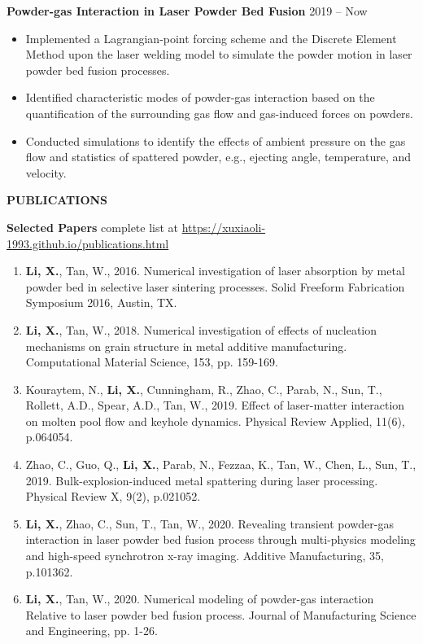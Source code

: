 \documentclass[11pt, letterpaper]{article}
\begin{document}
\vspace{3pt}

\textbf{Powder-gas Interaction in Laser Powder Bed Fusion} \hfill 2019 -- Now
\begin{itemize}[leftmargin=*, labelsep=5mm]
   \item Implemented a Lagrangian-point forcing scheme and the Discrete Element Method upon the
      laser welding model to simulate the powder motion in laser powder bed fusion processes.
   \item Identified characteristic modes of powder-gas interaction based on the quantification of
      the surrounding gas flow and gas-induced forces on powders.
   \item Conducted simulations to identify the effects of ambient pressure on the gas flow and
      statistics of spattered powder, e.g., ejecting angle, temperature, and velocity.
\end{itemize}

\vspace{9pt}

\textbf{PUBLICATIONS}

\fullrule

\textbf{Selected Papers} \hfill complete list at 
\href{https://xuxiaoli-1993.github.io/publications.html}
{https://xuxiaoli-1993.github.io/publications.html}

\begin{enumerate}[leftmargin=*, labelsep=4mm]
   \item \textbf{Li, X.}, Tan, W., 2016. Numerical investigation of laser absorption by metal powder
      bed in selective laser sintering processes. Solid Freeform Fabrication Symposium 2016, Austin,
      TX.

   \item \textbf{Li, X.}, Tan, W., 2018. Numerical investigation of effects of nucleation mechanisms
      on grain structure in metal additive manufacturing. Computational Material Science, 153, pp.
      159-169.

   \item Kouraytem, N., \textbf{Li, X.}, Cunningham, R., Zhao, C., Parab, N., Sun, T., Rollett,
      A.D., Spear, A.D., Tan, W., 2019. Effect of laser-matter interaction on molten pool flow and
      keyhole dynamics. Physical Review Applied, 11(6), p.064054.

   \item Zhao, C., Guo, Q., \textbf{Li, X.}, Parab, N., Fezzaa, K., Tan, W., Chen, L., Sun, T.,
      2019. Bulk-explosion-induced metal spattering during laser processing. Physical Review X,
      9(2), p.021052.

   \item \textbf{Li, X.}, Zhao, C., Sun, T., Tan, W., 2020. Revealing transient powder-gas
      interaction in laser powder bed fusion process through multi-physics modeling and high-speed
      synchrotron x-ray imaging. Additive Manufacturing, 35, p.101362. 

   \item \textbf{Li, X.}, Tan, W., 2020. Numerical modeling of powder-gas interaction Relative to
      laser powder bed fusion process. Journal of Manufacturing Science and Engineering, pp. 1-26.
\end{enumerate}
\end{document}

